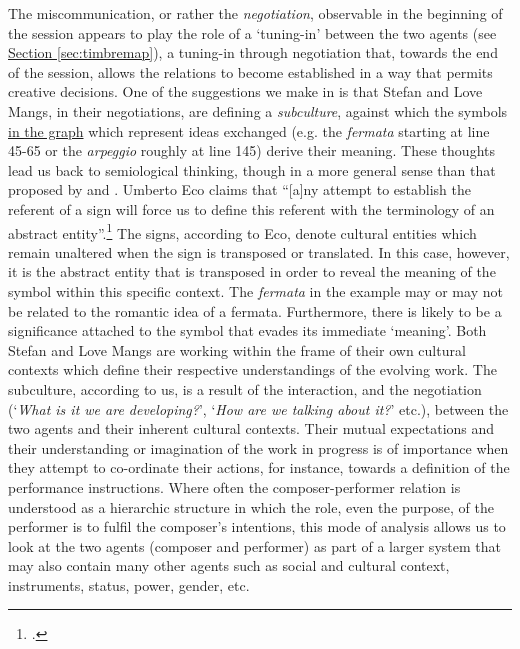 \label{sec:1-par:4}

The miscommunication, or rather the \emph{negotiation}, observable in the beginning of the session appears to play the role of a `tuning-in' between the two agents (see \hyperref[sec:timbremap]{Section \ref*{sec:timbremap}}), a tuning-in through negotiation that, towards the end of the session, allows the relations to become established in a way that permits creative decisions. One of the suggestions we make in  is that Stefan and Love Mangs, in their negotiations, are defining a \emph{subculture}, against which the symbols \hyperref[fig:timeline-mangs]{in the graph} which represent ideas exchanged (e.g. the \emph{fermata} starting at line 45-65 or the \emph{arpeggio} roughly at line 145) derive their meaning. These thoughts lead us back to semiological thinking, though in a more general sense than that proposed by \citeauthor{nattiez} and \citeauthor{molino}. Umberto Eco claims that ``[a]ny attempt to establish the referent of a sign will force us to define this referent with the terminology of an abstract entity''.\footcite[66]{eco71} The signs, according to Eco, denote cultural entities which remain unaltered when the sign is transposed or translated. In this case, however, it is the abstract entity that is transposed in order to reveal the meaning of the symbol within this specific context. The \emph{fermata} in the example may or may not be related to the romantic idea of a fermata. Furthermore, there is likely to be a significance attached to the symbol that evades its immediate `meaning'. Both Stefan and Love Mangs are working within the frame of their own cultural contexts which define their respective understandings of the evolving work. The subculture, according to us, is a result of the interaction, and the negotiation (`\emph{What is it we are  developing?}', `\emph{How are we talking about it?}' etc.), between the two agents and their inherent cultural contexts. Their mutual expectations and their understanding or imagination of the work in progress is of importance when they attempt to co-ordinate their actions, for instance, towards a definition of the performance instructions. Where often the composer-performer relation is understood as a hierarchic structure in which the role, even the purpose, of the performer is to fulfil the composer's intentions, this mode of analysis allows us to look at the two agents (composer and performer) as part of a larger system that may also contain many other agents such as social and cultural context, instruments, status, power, gender, etc.

